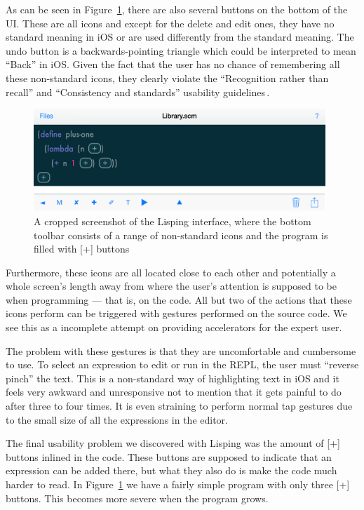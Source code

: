 As can be seen in Figure~\ref{fig:Lisping_screenshot}, there are also several buttons on the bottom of the UI\@. 
These are all icons and except for the delete and edit ones, they have no standard meaning in iOS or are used differently from the standard meaning. 
The undo button is a backwards-pointing triangle which could be interpreted to mean “Back” in iOS\@.
Given the fact that the user has no chance of remembering all these non-standard icons, they clearly violate the ``Recognition rather than recall'' and ``Consistency and standards'' usability guidelines\,\cite{nielsen1990heuristic}. 

\begin{figure}
	\centering
		\includegraphics[width=110mm]{diagrams/Lisping_screenshot.png}
	\caption{A cropped screenshot of the Lisping interface, where the bottom
	toolbar consists of a range of non-standard icons and the program is filled
	with [+] buttons}
\label{fig:Lisping_screenshot}
\end{figure}

Furthermore, these icons are all located close to each other and potentially a whole screen's length away from where the user's attention is supposed to be when programming --- that is, on the code. All but two of the actions that these icons perform can be triggered with gestures performed on the source code. We see this as a incomplete attempt on providing accelerators for the expert user.

The problem with these gestures is that they are uncomfortable and cumbersome to use. To select an expression to edit or run in the REPL, the user must ``reverse pinch'' the text. This is a non-standard way of highlighting text in iOS and it feels very awkward and unresponsive not to mention that it gets painful to do after three to four times. It is even straining to perform normal tap gestures due to the small size of all the expressions in the editor.

The final usability problem we discovered with Lisping was the amount of [+] buttons inlined in the code. These buttons are supposed to indicate that an expression can be added there, but what they also do is make the code much harder to read.
In Figure~\ref{fig:Lisping_screenshot} we have a fairly simple program with
only three [+] buttons. This becomes more severe when the program grows.

